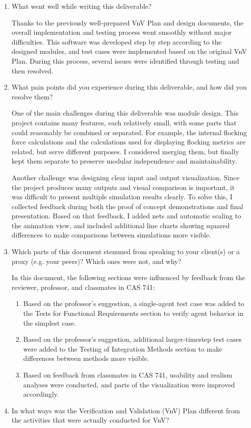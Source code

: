 \documentclass[12pt, titlepage]{article}
\begin{document}
\begin{enumerate}
  \item What went well while writing this deliverable? 
  
  Thanks to the previously well-prepared VnV Plan and design documents, the 
  overall implementation and testing process went smoothly without major 
  difficulties. This software was developed step by step according to the 
  designed modules, and test cases were implemented based on the original 
  VnV Plan. During this process, several issues were identified through 
  testing and then resolved.
  \item What pain points did you experience during this deliverable, and how
    did you resolve them?

  One of the main challenges during this deliverable was module design. 
  This project contains many features, each relatively small, with some parts 
  that could reasonably be combined or separated. For example, the internal 
  flocking force calculations and the calculations used for displaying flocking 
  metrics are related, but serve different purposes. I considered merging them, 
  but finally kept them separate to preserve modular independence and 
  maintainability.

  Another challenge was designing clear input and output visualization. Since 
  the project produces many outputs and visual comparison is important, it was 
  difficult to present multiple simulation results clearly. To solve this, I 
  collected feedback during both the proof of concept demonstrations and final 
  presentation. Based on that feedback, I added nets and automatic scaling to 
  the animation view, and included additional line charts showing squared 
  differences to make comparisons between simulations more visible.
  \item Which parts of this document stemmed from speaking to your client(s) or
  a proxy (e.g. your peers)? Which ones were not, and why?

  In this document, the following sections were influenced by feedback from 
  the reviewer, professor, and classmates in CAS 741:
  \begin{enumerate}
  \item Based on the professor's suggestion, a single-agent test case was 
  added to the Tests for Functional Requirements section to verify agent 
  behavior in the simplest case.
  \item Based on the professor's suggestion, additional larger-timestep test 
  cases were added to the Testing of Integration Methods section to make 
  differences between methods more visible.
  \item Based on feedback from classmates in CAS 741, usability and realism 
  analyses were conducted, and parts of the visualization were improved 
  accordingly.
  \end{enumerate}
  \item In what ways was the Verification and Validation (VnV) Plan different
  from the activities that were actually conducted for VnV?  


\end{enumerate}
\end{document}
